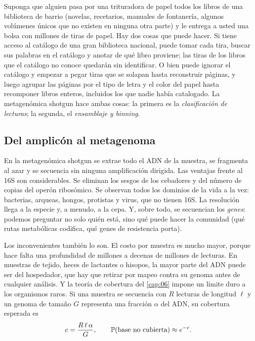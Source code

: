 \begin{intuicion}
Suponga que alguien pasa por una trituradora de papel todos los libros de una biblioteca de barrio (novelas, recetarios, manuales de fontanería, algunos volúmenes únicos que no existen en ninguna otra parte) y le entrega a usted una bolsa con millones de tiras de papel. Hay dos cosas que puede hacer. Si tiene acceso al catálogo de una gran biblioteca nacional, puede tomar cada tira, buscar sus palabras en el catálogo y anotar de qué libro proviene; las tiras de los libros que el catálogo no conoce quedarán sin identificar. O bien puede ignorar el catálogo y empezar a pegar tiras que se solapan hasta reconstruir páginas, y luego agrupar las páginas por el tipo de letra y el color del papel hasta recomponer libros enteros, incluidos los que nadie había catalogado. La metagenómica shotgun hace ambas cosas: la primera es la \emph{clasificación de lecturas}; la segunda, el \emph{ensamblaje y binning}.
\end{intuicion}

\subsection{Del amplicón al metagenoma}

En la metagenómica shotgun se extrae todo el ADN de la muestra, se fragmenta al azar y se secuencia sin ninguna amplificación dirigida. Las ventajas frente al 16S son considerables. Se eliminan los sesgos de los cebadores y del número de copias del operón ribosómico. Se observan todos los dominios de la vida a la vez: bacterias, arqueas, hongos, protistas y virus, que no tienen 16S. La resolución llega a la especie y, a menudo, a la cepa. Y, sobre todo, se secuencian los \emph{genes}: podemos preguntar no solo quién está, sino qué puede hacer la comunidad (qué rutas metabólicas codifica, qué genes de resistencia porta).

Los inconvenientes también lo son. El costo por muestra es mucho mayor, porque hace falta una profundidad de millones a decenas de millones de lecturas. En muestras de tejido, heces de lactantes o hisopos, la mayor parte del ADN puede ser del hospedador, que hay que retirar por mapeo contra su genoma antes de cualquier análisis. Y la teoría de cobertura del \cref{cap:06} impone un límite duro a los organismos raros. Si una muestra se secuencia con $R$ lecturas de longitud $\ell$ y un genoma de tamaño $G$ representa una fracción $\alpha$ del ADN, su cobertura esperada es
\begin{equation}\label{eq:14-cov}
c = \frac{R\,\ell\,\alpha}{G}, \qquad \mathbb{P}(\text{base no cubierta}) \approx e^{-c}.
\end{equation}

